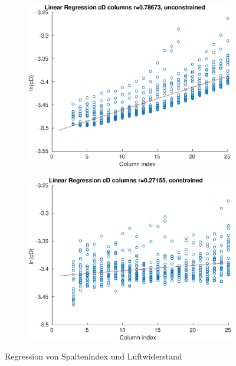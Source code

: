\begin{figure}[h]
	\centering
	\begin{subfigure}[t]{0.5\textwidth}
		\centering
		\includegraphics[width=1\linewidth]{bilder/6pt1000Samples/cDRegressionUncon}
	\end{subfigure}\hfill
	\begin{subfigure}[t]{0.5\textwidth}
		\centering
		\includegraphics[width=1\linewidth]{bilder/6pt1000Samples/cDRegressionCon}
	\end{subfigure}
	\caption{Regression von Spaltenindex und Luftwiderstand}
	\label{fig:regCDCol}
\end{figure}


